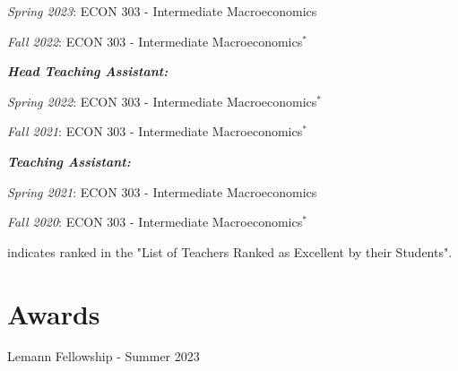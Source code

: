 \documentclass[letterpaper,11pt]{article}
\begin{document}
\begin{adjustwidth}{9mm}{0mm}
  \textit{Spring 2023}: ECON 303 - Intermediate Macroeconomics
\end{adjustwidth}

\begin{adjustwidth}{9mm}{0mm}
  \textit{Fall 2022}: ECON 303 - Intermediate Macroeconomics$^*$
\end{adjustwidth}

\begin{adjustwidth}{6mm}{0mm}
  \textbf{\textit{Head Teaching Assistant:}}
\end{adjustwidth}

\begin{adjustwidth}{9mm}{0mm}
  \textit{Spring 2022}: ECON 303 - Intermediate Macroeconomics$^*$
\end{adjustwidth}

\begin{adjustwidth}{9mm}{0mm}
  \textit{Fall 2021}: ECON 303 - Intermediate Macroeconomics$^*$
\end{adjustwidth}

\begin{adjustwidth}{6mm}{0mm}
  \textbf{\textit{Teaching Assistant:}}
\end{adjustwidth}

\begin{adjustwidth}{9mm}{0mm}
  \textit{Spring 2021}: ECON 303 - Intermediate Macroeconomics
\end{adjustwidth}

\begin{adjustwidth}{9mm}{0mm}
  \textit{Fall 2020}: ECON 303 - Intermediate Macroeconomics$^*$
\end{adjustwidth}

\vspace{3mm}

\begin{adjustwidth}{3mm}{0mm}
  \scriptsize * indicates ranked in the "List of Teachers Ranked as Excellent by their Students".
\end{adjustwidth}

\section{Awards}

\begin{adjustwidth}{6mm}{0mm}
  Lemann Fellowship - Summer 2023
\end{adjustwidth}
\end{document}
